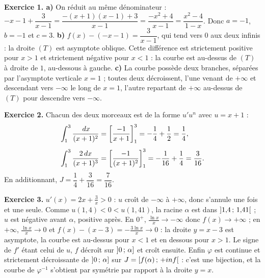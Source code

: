 \begin{corrige}
\textbf{Exercice 1. a)} On réduit au même dénominateur :
$-x-1+\dfrac{3}{x-1} = \dfrac{-(x+1)(x-1)+3}{x-1}
= \dfrac{-x^{2}+4}{x-1} = \dfrac{x^{2}-4}{1-x}$. Donc $a = -1$, $b = -1$ et
$c = 3$.
\textbf{b)} $f(x)-(-x-1) = \dfrac{3}{x-1}$, qui tend vers $0$ aux deux
infinis : la droite $(T)$ est asymptote oblique. Cette différence est
strictement positive pour $x>1$ et strictement négative pour $x<1$ : la courbe
est au-dessus de $(T)$ à droite de $1$, au-dessous à gauche.
\textbf{c)} La courbe possède deux branches, séparées par l'asymptote
verticale $x = 1$ ; toutes deux décroissent, l'une venant de $+\infty$ et
descendant vers $-\infty$ le long de $x = 1$, l'autre repartant de $+\infty$
au-dessus de $(T)$ pour descendre vers $-\infty$.

\textbf{Exercice 2.} Chacun des deux morceaux est de la forme $u'u^{n}$ avec
$u = x+1$ :
\[\begin{aligned}
\int_{1}^{3}\frac{\,dx}{(x+1)^{2}} &= \left[\frac{-1}{x+1}\right]_{1}^{3}
  = -\frac14+\frac12 = \frac14,
  \\[4pt]
  \int_{1}^{3}\frac{2\,dx}{(x+1)^{3}} &= \left[\frac{-1}{(x+1)^{2}}\right]_{1}^{3}
  = -\frac{1}{16}+\frac14 = \frac{3}{16}.
\end{aligned}\]
En additionnant, $J = \dfrac14+\dfrac{3}{16} = \dfrac{7}{16}$.

\textbf{Exercice 3.} $u'(x) = 2x+\frac3x>0$ : $u$ croît de $-\infty$ à $+\infty$, donc
s'annule une fois et une seule. Comme $u(1{,}4)<0<u(1{,}41)$, la racine
$\alpha$ est dans $\left]1{,}4\,;\,1{,}41\right[$ ; $u$ est négative avant
$\alpha$, positive après. En $0^{+}$, $\frac{\ln x}{x}\to-\infty$ donc
$f(x)\to+\infty$ ; en $+\infty$, $\frac{\ln x}{x}\to0$ et
$f(x)-(x-3) = -\frac{3\ln x}{x}\to0$ : la droite $y = x-3$ est asymptote, la
courbe est au-dessus pour $x<1$ et en dessous pour $x>1$. Le signe de $f'$
étant celui de $u$, $f$ décroît sur $\left]0\,;\,\alpha\right]$ et croît
ensuite. Enfin $\varphi$ est continue et strictement décroissante de
$\left]0\,;\,\alpha\right]$ sur $J = \left[f(\alpha)\,;\,+inf\right[$ :
c'est une bijection, et la courbe de $\varphi^{-1}$ s'obtient par symétrie
par rapport à la droite $y = x$.

\end{corrige}

